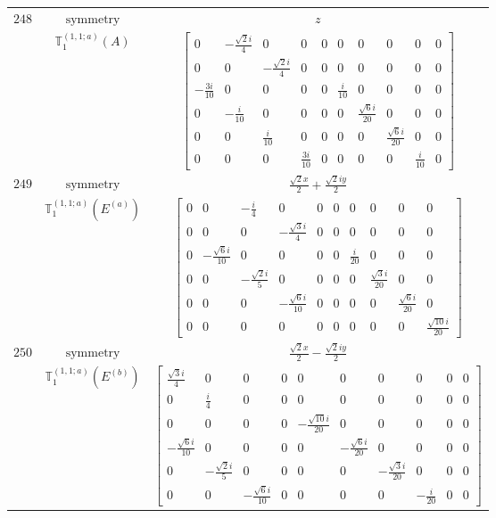 \documentclass[fleqn,8pt,landscape]{jsarticle}
\begin{document}
\begin{longtable}{ccc}
$ 248 $ & $ \text{symmetry} $ & $ z $ \\
$  $ & $ \mathbb{T}_{1}^{(1,1;a)}(A) $ & $ \begin{bmatrix} 0 & - \frac{\sqrt{2} i}{4} & 0 & 0 & 0 & 0 & 0 & 0 & 0 & 0 \\ 0 & 0 & - \frac{\sqrt{2} i}{4} & 0 & 0 & 0 & 0 & 0 & 0 & 0 \\ - \frac{3 i}{10} & 0 & 0 & 0 & 0 & \frac{i}{10} & 0 & 0 & 0 & 0 \\ 0 & - \frac{i}{10} & 0 & 0 & 0 & 0 & \frac{\sqrt{6} i}{20} & 0 & 0 & 0 \\ 0 & 0 & \frac{i}{10} & 0 & 0 & 0 & 0 & \frac{\sqrt{6} i}{20} & 0 & 0 \\ 0 & 0 & 0 & \frac{3 i}{10} & 0 & 0 & 0 & 0 & \frac{i}{10} & 0 \end{bmatrix} $ \\ \hline
$ 249 $ & $ \text{symmetry} $ & $ \frac{\sqrt{2} x}{2} + \frac{\sqrt{2} i y}{2} $ \\
$  $ & $ \mathbb{T}_{1}^{(1,1;a)}(E^{(a)}) $ & $ \begin{bmatrix} 0 & 0 & - \frac{i}{4} & 0 & 0 & 0 & 0 & 0 & 0 & 0 \\ 0 & 0 & 0 & - \frac{\sqrt{3} i}{4} & 0 & 0 & 0 & 0 & 0 & 0 \\ 0 & - \frac{\sqrt{6} i}{10} & 0 & 0 & 0 & 0 & \frac{i}{20} & 0 & 0 & 0 \\ 0 & 0 & - \frac{\sqrt{2} i}{5} & 0 & 0 & 0 & 0 & \frac{\sqrt{3} i}{20} & 0 & 0 \\ 0 & 0 & 0 & - \frac{\sqrt{6} i}{10} & 0 & 0 & 0 & 0 & \frac{\sqrt{6} i}{20} & 0 \\ 0 & 0 & 0 & 0 & 0 & 0 & 0 & 0 & 0 & \frac{\sqrt{10} i}{20} \end{bmatrix} $ \\ \hline
$ 250 $ & $ \text{symmetry} $ & $ \frac{\sqrt{2} x}{2} - \frac{\sqrt{2} i y}{2} $ \\
$  $ & $ \mathbb{T}_{1}^{(1,1;a)}(E^{(b)}) $ & $ \begin{bmatrix} \frac{\sqrt{3} i}{4} & 0 & 0 & 0 & 0 & 0 & 0 & 0 & 0 & 0 \\ 0 & \frac{i}{4} & 0 & 0 & 0 & 0 & 0 & 0 & 0 & 0 \\ 0 & 0 & 0 & 0 & - \frac{\sqrt{10} i}{20} & 0 & 0 & 0 & 0 & 0 \\ - \frac{\sqrt{6} i}{10} & 0 & 0 & 0 & 0 & - \frac{\sqrt{6} i}{20} & 0 & 0 & 0 & 0 \\ 0 & - \frac{\sqrt{2} i}{5} & 0 & 0 & 0 & 0 & - \frac{\sqrt{3} i}{20} & 0 & 0 & 0 \\ 0 & 0 & - \frac{\sqrt{6} i}{10} & 0 & 0 & 0 & 0 & - \frac{i}{20} & 0 & 0 \end{bmatrix} $ \\ \hline

\end{longtable}
\end{document}
